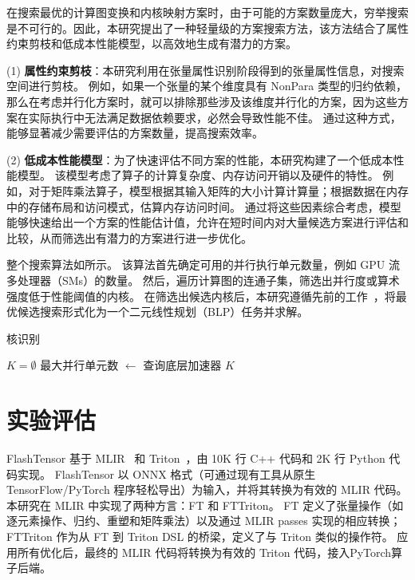 在搜索最优的计算图变换和内核映射方案时，由于可能的方案数量庞大，穷举搜索是不可行的。因此，本研究提出了一种轻量级的方案搜索方法，该方法结合了属性约束剪枝和低成本性能模型，以高效地生成有潜力的方案。

(1) \textbf{属性约束剪枝}：本研究利用在张量属性识别阶段得到的张量属性信息，对搜索空间进行剪枝。
例如，如果一个张量的某个维度具有 NonPara 类型的归约依赖，那么在考虑并行化方案时，就可以排除那些涉及该维度并行化的方案，因为这些方案在实际执行中无法满足数据依赖要求，必然会导致性能不佳。
通过这种方式，能够显著减少需要评估的方案数量，提高搜索效率。

(2) \textbf{低成本性能模型}：为了快速评估不同方案的性能，本研究构建了一个低成本性能模型。
该模型考虑了算子的计算复杂度、内存访问开销以及硬件的特性。
例如，对于矩阵乘法算子，模型根据其输入矩阵的大小计算计算量；根据数据在内存中的存储布局和访问模式，估算内存访问时间。
通过将这些因素综合考虑，模型能够快速给出一个方案的性能估计值，允许在短时间内对大量候选方案进行评估和比较，从而筛选出有潜力的方案进行进一步优化。


整个搜索算法如所示。
该算法首先确定可用的并行执行单元数量，例如 GPU 流多处理器（SMs）的数量。
然后，遍历计算图的连通子集，筛选出并行度或算术强度低于性能阈值的内核。
在筛选出候选内核后，本研究遵循先前的工作~\cite{hu2024korch}，将最优候选搜索形式化为一个二元线性规划（BLP）任务并求解。

\begin{algorithm}[ht]
{
\caption{核识别}
    \label{alg:kernel_identify}
     { 
        $K = \emptyset $\; 
        最大并行单元数 $\leftarrow$ 查询底层加速器\;
        \Return $K$\;
    }
}
\end{algorithm}

\section{实验评估}
FlashTensor 基于 MLIR~\cite {lattner2020mlir} 和 Triton~\cite {tillet2019triton}，由 10K 行 C++ 代码和 2K 行 Python 代码实现。
FlashTensor 以 ONNX 格式（可通过现有工具从原生 TensorFlow/PyTorch 程序轻松导出）为输入，并将其转换为有效的 MLIR 代码。
本研究在 MLIR 中实现了两种方言：FT 和 FTTriton。
FT 定义了张量操作（如逐元素操作、归约、重塑和矩阵乘法）以及通过 MLIR passes 实现的相应转换；
FTTriton 作为从 FT 到 Triton DSL 的桥梁，定义了与 Triton 类似的操作符。
应用所有优化后，最终的 MLIR 代码将转换为有效的 Triton 代码，接入PyTorch算子后端。


